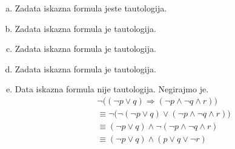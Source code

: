 \begin{enumerate}[(a)]

\item Zadata iskazna formula jeste tautologija.

\item Zadata iskazna formula je tautologija.

\item Zadata iskazna formula je tautologija.

\item Zadata iskazna formula je tautologija.

\item Data iskazna formula nije tautologija. Negirajmo je. 
\begin{align*}
&\neg\big((\neg p\vee  q)\Rightarrow(\neg p\wedge \neg q\wedge r)\big) \\
&\equiv \neg\big(\neg(\neg p\vee q)\vee (\neg p\wedge\neg q\wedge r)\big)\\
&\equiv (\neg p\vee q)\wedge \neg(\neg p\wedge\neg q\wedge r)\\
&\equiv (\neg p\vee q)\wedge (p\vee q\vee\neg r)
\end{align*}


\end{enumerate}
